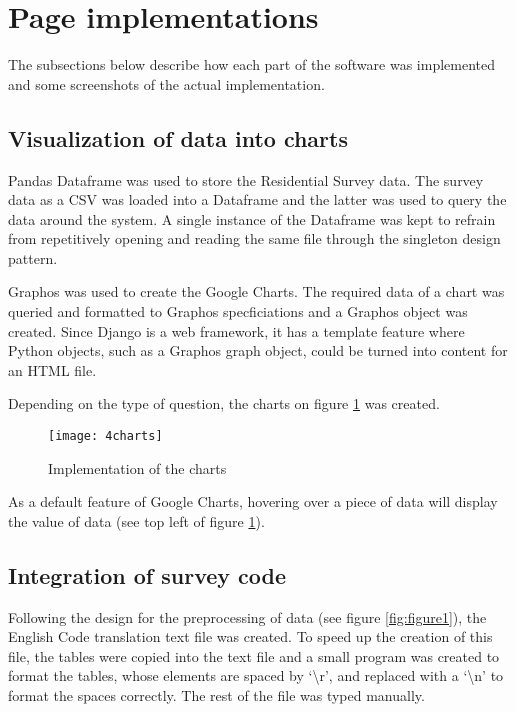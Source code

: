 \section{Page implementations}
The subsections below describe how each part of the software was implemented and some screenshots of the actual implementation.

\subsection{Visualization of data into charts}
Pandas Dataframe was used to store the Residential Survey data. The survey data as a CSV was loaded into a Dataframe and the latter was used to query the data around the system. A single instance of the Dataframe was kept to refrain from repetitively opening and reading the same file through the singleton design pattern.\par

Graphos was used to create the Google Charts. The required data of a chart was queried and formatted to Graphos\textsc{} specficiations and a Graphos object was created. Since Django is a web framework, it has a template feature where Python objects, such as a Graphos graph object, could be turned into content for an HTML file.\par

Depending on the type of question, the charts on figure \ref{fig:4charts} was created.

\begin{figure}[h]
\centering
\texttt{[image: 4charts]}
\caption{Implementation of the charts}
\label{fig:4charts}
\end{figure}

As a default feature of Google Charts, hovering over a piece of data will display the value of data (see top left of figure \ref{fig:4charts}).

\subsection{Integration of survey code}
Following the design for the preprocessing of data (see figure \ref{fig:figure1}), the English Code translation text file was created. To speed up the creation of this file, the tables were copied into the text file and a small program was created to format the tables, whose elements are spaced by `\textbackslash r', and replaced with a `\textbackslash n' to format the spaces correctly. The rest of the file was typed manually.\par

